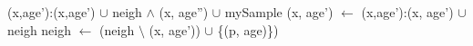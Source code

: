\begin{algorithm}
\begin{algorithmic}[1]
                     \Else
                        \State (x,age’):(x,age') $\cup$ neigh $\land$ (x, age'') $\cup$ mySample
                            \State (x, age') $\leftarrow$ (x,age’):(x, age’) $\cup$ neigh
                            \EndIf
                        \State neigh $\leftarrow$ (neigh $\setminus$ (x, age')) $\cup$ \{(p, age)\})
                    \EndIf
                \EndIf
                    
                   
                        
                   
            \EndFor
        \EndFunction
	  
\end{algorithmic}
\end{algorithm}

